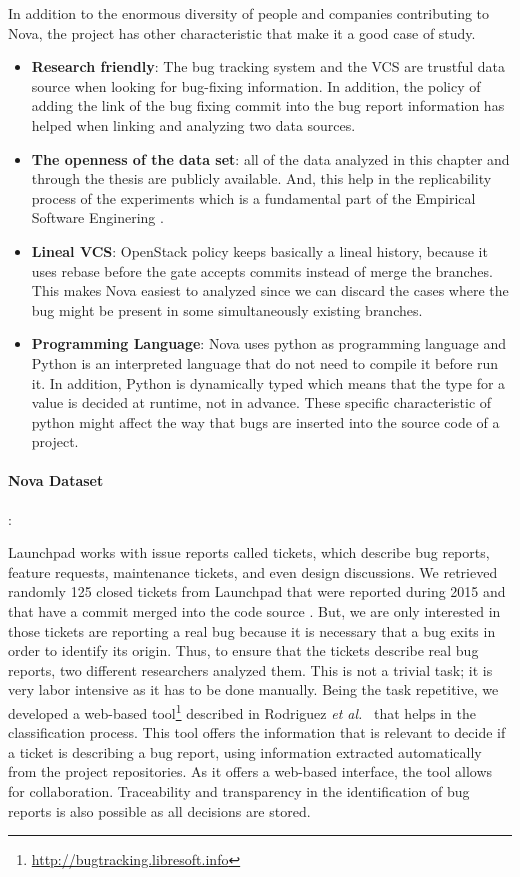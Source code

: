 \documentclass[a4paper, 12pt]{book}
\begin{document}
In addition to the enormous diversity of people and companies contributing to Nova, the project has other characteristic that make it a good case of study.
\begin{itemize}
	\item \textbf{Research friendly}: The bug tracking system and the VCS are trustful data source when looking for bug-fixing information. In addition, the policy of adding the link of the bug fixing commit into the bug report information has helped when linking and analyzing two data sources.
	\item \textbf{The openness of the data set}: all of the data analyzed in this chapter and through the thesis are publicly available. And, this help in the replicability process of the experiments which is a fundamental part of the Empirical Software Enginering .
	\item \textbf{Lineal VCS}: OpenStack policy keeps basically a lineal history, because it uses rebase before the gate accepts commits instead of merge the branches. This makes Nova easiest to analyzed since we can discard the cases where the bug might be present in some simultaneously existing branches.  
	\item \textbf{Programming Language}: Nova uses python as programming language and Python is an interpreted language that do not need to compile it before run it. In addition, Python is dynamically typed which means that the type for a value is decided at runtime, not in advance. These specific characteristic of python might affect the way that bugs are inserted into the source code of a project.
	\end{itemize}

\paragraph{Nova Dataset}:

Launchpad works with issue reports called tickets, which describe bug reports, feature requests, maintenance tickets, and even design discussions. We retrieved randomly 125 closed tickets from Launchpad that were reported during 2015 and that have a commit merged into the code source . But, we are only interested in those tickets are reporting a real bug because it is necessary that a bug exits in order to identify its origin. Thus, to ensure that the tickets describe real bug reports, two different researchers analyzed them. This is not a trivial task; it is very labor intensive as it has to be done manually. Being the task repetitive, we developed a web-based tool\footnote{\url{http://bugtracking.libresoft.info}} described in Rodriguez \emph{et al.}~\cite{rodriguez2016bugtracking} that helps in the classification process. This tool offers the information that is relevant to decide if a ticket is describing a bug report, using information extracted automatically from the project repositories. As it offers a web-based interface, the tool allows for collaboration. Traceability and transparency in the identification of bug reports is also possible as all decisions are stored. 
\end{document}
